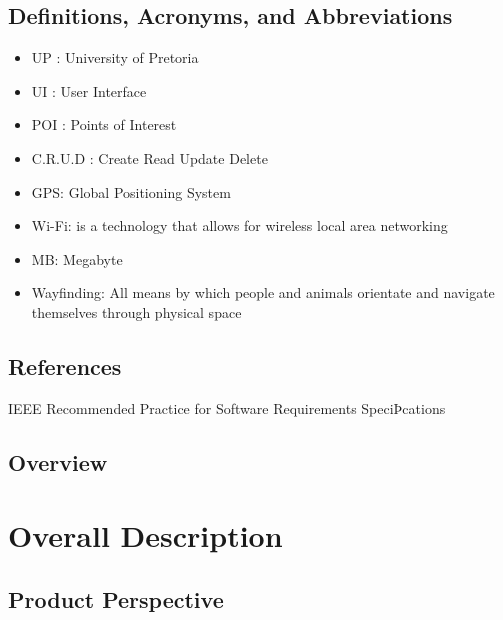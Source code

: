 \documentclass{article}
\begin{document}
        \subsection{Definitions, Acronyms, and Abbreviations}
	\begin{itemize}
  				\item UP : University of Pretoria
				\item UI : User Interface
				\item POI : Points of Interest
				\item C.R.U.D : Create Read Update Delete
				\item GPS: Global Positioning System
				\item Wi-Fi: is a technology that allows for wireless local area networking
				\item MB: Megabyte
				\item Wayfinding: All means by which people and animals orientate and navigate themselves through physical space
			\end{itemize}
        \subsection{References}
	{IEEE Recommended Practice for Software Requirements SpeciÞcations}
        \subsection{Overview}
	
	\section{Overall Description}
		
        \subsection{Product Perspective}
        
\end{document}
